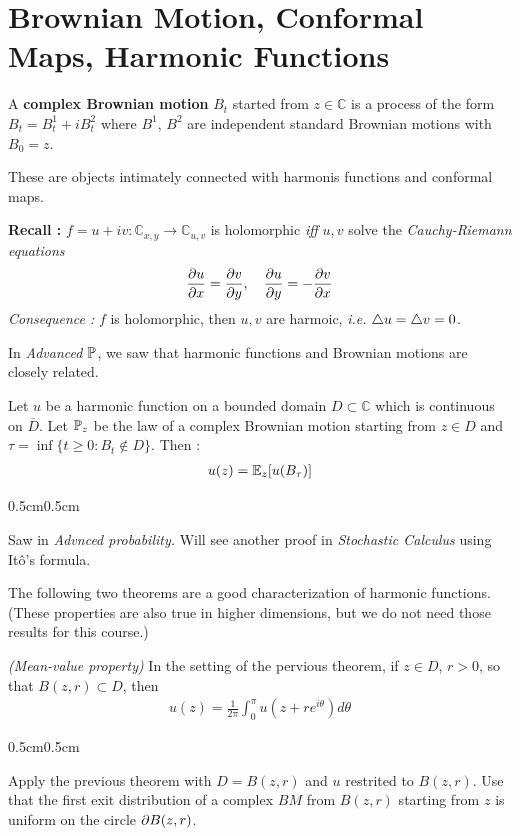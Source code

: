\documentclass[12pt,a4paper]{article}
\newenvironment{proof}
{\begin{changemargin}{0.5cm}{0.5cm} 
	}%
	{\end{changemargin}
}
\newenvironment{p}
{\begin{proof} 
	}%
	{\end{proof}
}
\begin{document}
\section*{Brownian Motion, Conformal Maps, Harmonic Functions}

 A \textbf{complex Brownian motion} $B_t$ started from $z\in \mathbb{C}$ is a process of the form $B_t = B_t^1 + iB_t^2$ where $B^1$, $B^2$ are independent standard Brownian motions with $B_0 =z$. 
\s

These are objects intimately connected with harmonis functions and conformal maps.
\s

\textbf{Recall :} $f= u + iv : \mathbb{C}_{x,y} \rightarrow \mathbb{C}_{u,v}$ is holomorphic \emph{iff} $u,v$ solve the \emph{Cauchy-Riemann equations}
\begin{align*}
\frac{\partial u}{\partial x} = \frac{\partial v}{\partial y}, \quad \frac{\partial u}{\partial y} = - \frac{\partial v}{\partial x}
\end{align*}
\textit{Consequence :} $f$ is holomorphic, then $u,v$ are harmoic, \textit{i.e.} $\triangle u = \triangle v=0$.
\s

In \emph{Advanced $\mathbb{P}$}, we saw that harmonic functions and Brownian motions are closely related. 
\s

\thm Let $u$ be a harmonic function on a bounded domain $D\subset \mathbb{C}$ which is continuous on $\overline{D}$. Let $\mathbb{P}_z$ be the law of a complex Brownian motion starting from $z\in D$ and $\tau = \inf \{ t\geq 0 : B_t \not\in D \}$. Then :
\begin{align*}
u(z) = \mathbb{E}_z [u(B_{\tau})]
\end{align*}
\begin{p}
\pf Saw in \emph{Advnced probability.} Will see another proof in \emph{Stochastic Calculus} using It\^o's formula.
\end{p}
\s

The following two theorems are a good characterization of harmonic functions.(These properties are also true in higher dimensions, but we do not need those results for this course.)
\s

\thm \emph{(Mean-value property)} In the setting of the pervious theorem, if $z\in D$, $r>0$, so that $B(z,r)\subset D$, then
\begin{align*}
u(z) = \frac{1}{2\pi} \int_0^{\pi} u(z + re^{i\theta}) d\theta
\end{align*}
\begin{p}
\pf Apply the previous theorem with $D= B(z,r)$ and $u$ restrited to $B(z,r)$. Use that the first exit distribution of a complex $BM$ from $B(z,r)$ starting from $z$ is uniform on the circle $\partial B(z,r)$.

\eop
\end{p}
\s
\end{document}
